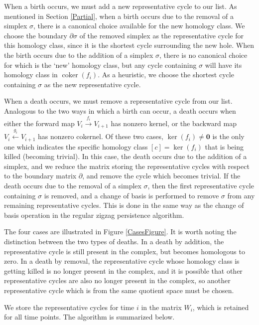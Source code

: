 \documentclass[12pt]{article}
\DeclareMathOperator{\coker}{coker}
\begin{document}
When a birth occurs, we must add a new representative cycle to our list. As mentioned in Section \ref{Partial}, when a birth occurs due to the removal of a simplex $\sigma$, there is a canonical choice available for the new homology class. We choose the boundary $\partial\sigma$ of the removed simplex as the representative cycle for this homology class, since it is the shortest cycle surrounding the new hole. When the birth occurs due to the addition of a simplex $\sigma$, there is no canonical choice for which is the `new' homology class, but any cycle containing $\sigma$ will have its homology class in $\coker(f_i)$. As a heuristic, we choose the shortest cycle containing $\sigma$ as the new representative cycle.

When a death occurs, we must remove a representative cycle from our list. Analogous to the two ways in which a birth can occur, a death occurs when either the forward map $V_i \overset{f_i}{\longrightarrow} V_{i+1}$ has nonzero kernel, or the backward map $V_i \overset{g_i}{\longleftarrow} V_{i+1}$ has nonzero cokernel. Of these two cases, $\ker(f_i) \neq \textbf{0}$ is the only one which indicates the specific homology class $[c] = \ker(f_i)$ that is being killed (becoming trivial). In this case, the death occurs due to the addition of a simplex, and we reduce the matrix storing the representative cycles with respect to the boundary matrix $\partial$, and remove the cycle which becomes trivial. If the death occurs due to the removal of a simplex $\sigma$, then the first representative cycle containing $\sigma$ is removed, and a change of basis is performed to remove $\sigma$ from any remaining representative cycles. This is done in the same way as the change of basis operation in the regular zigzag persistence algorithm.

The four cases are illustrated in Figure \ref{CasesFigure}. It is worth noting the distinction between the two types of deaths. In a death by addition, the representative cycle is still present in the complex, but becomes homologous to zero. In a death by removal, the representative cycle whose homology class is getting killed is no longer present in the complex, and it is possible that other representative cycles are also no longer present in the complex, so another representative cycle which is from the same quotient space must be chosen.

We store the representative cycles for time $i$ in the matrix $W_i$, which is retained for all time points. The algorithm is summarized below.
\end{document}
